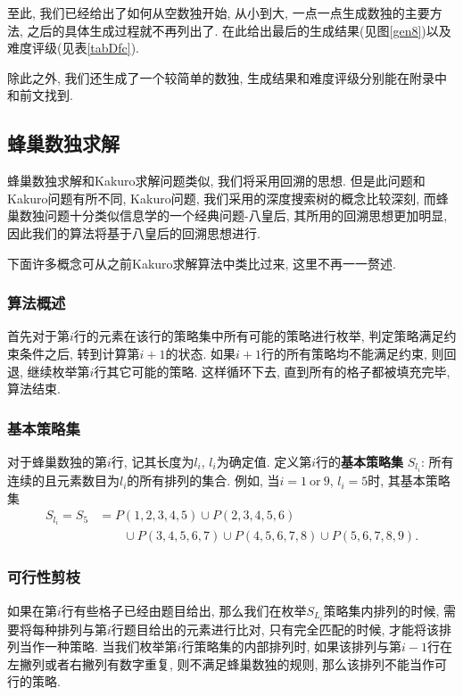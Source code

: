             至此, 我们已经给出了如何从空数独开始, 从小到大,
            一点一点生成数独的主要方法, 之后的具体生成过程就不再列出了.
            在此给出最后的生成结果(见图\ref{gen8})以及难度评级(见表\ref{tabDfc}).

            除此之外, 我们还生成了一个较简单的数独, 生成结果和难度评级分别能在附录中和前文找到.

    \subsection{蜂巢数独求解}
        蜂巢数独求解和Kakuro求解问题类似, 我们将采用回溯的思想.
        但是此问题和Kakuro问题有所不同, Kakuro问题, 我们采用的深度搜索树的概念比较深刻,
        而蜂巢数独问题十分类似信息学的一个经典问题-八皇后\citep{Baidu_EightQueens},
        其所用的回溯思想更加明显, 因此我们的算法将基于八皇后的回溯思想进行.

        下面许多概念可从之前Kakuro求解算法中类比过来, 这里不再一一赘述.

        \subsubsection{算法概述}
            首先对于第$i$行的元素在该行的策略集中所有可能的策略进行枚举, 判定策略满足约束条件之后,
            转到计算第$i+1$的状态.
            如果$i+1$行的所有策略均不能满足约束, 则回退, 继续枚举第$i$行其它可能的策略.
            这样循环下去, 直到所有的格子都被填充完毕, 算法结束.

        \subsubsection{基本策略集}
            对于蜂巢数独的第$i$行, 记其长度为$l_{i}$, $l_{i}$为确定值.
            定义第$i$行的\textbf{基本策略集} $S_{l_{i}}$:
            所有连续的且元素数目为$l_{i}$的所有排列的集合.
            例如, 当$i=1\ \text{or}\ 9$, $l_{i}=5$时,
            其基本策略集
                \begin{equation*}
                    \begin{split}
                    S_{l_{i}}= S_{5}
                              & = P(1,2,3,4,5)\cup P(2,3,4,5,6)\\
                              & \qquad\cup P(3,4,5,6,7)\cup P(4,5,6,7,8)\cup P(5,6,7,8,9).
                    \end{split}
                \end{equation*}

        \subsubsection{可行性剪枝}
                如果在第$i$行有些格子已经由题目给出, 那么我们在枚举$S_{L_{i}}$策略集内排列的时候,
                需要将每种排列与第$i$行题目给出的元素进行比对,
                只有完全匹配的时候, 才能将该排列当作一种策略.
                当我们枚举第$i$行策略集的内部排列时, 如果该排列与第$i-1$行在左撇列或者右撇列有数字重复,
                则不满足蜂巢数独的规则, 那么该排列不能当作可行的策略.

